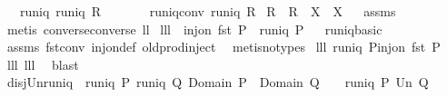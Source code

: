\begin{isabellebody}
\ \ \ runiq{\isacharcolon}\ {\isachardoublequoteopen}runiq\ R{\isachardoublequoteclose}\isanewline
\ \ \ \ \ \ \ runiq{\isacharunderscore}conv{\isacharcolon}\ {\isachardoublequoteopen}runiq\ {\isacharparenleft}R{\isacharcircum}{\isacharminus}{}{\isacharparenright}{\isachardoublequoteclose}\isanewline
{}\ {\isachardoublequoteopen}{\isacharparenleft}R{\isacharcircum}{\isacharminus}{}{\isacharparenright}\ {\isacharbackquote}{\isacharbackquote}\ R\ {\isacharbackquote}{\isacharbackquote}\ X\ {\isasymsubseteq}\ X{\isachardoublequoteclose}%
\isadelimproof
\ %
\endisadelimproof
%
\isatagproof
{}\isamarkupfalse%
\ assms\ \isamarkupfalse%
\ {\isacharparenleft}metis\ converse{\isacharunderscore}converse\ ll{}{}{\isacharparenright}%
\endisatagproof
{\isafoldproof}%
%
\isadelimproof
%
\endisadelimproof
\isanewline
\isanewline
{}\isamarkupfalse%
\ lll{}{}{\isacharcolon}\ \ {\isachardoublequoteopen}inj{\isacharunderscore}on\ fst\ P{\isachardoublequoteclose}\ \ {\isachardoublequoteopen}runiq\ P{\isachardoublequoteclose}%
\isadelimproof
\ %
\endisadelimproof
%
\isatagproof
{}\isamarkupfalse%
\ runiq{\isacharunderscore}basic\ \isanewline
{}\isamarkupfalse%
\ assms\ fst{\isacharunderscore}conv\ inj{\isacharunderscore}on{\isacharunderscore}def\ old{\isachardot}prod{\isachardot}inject\ \isamarkupfalse%
\ {\isacharparenleft}metis{\isacharparenleft}no{\isacharunderscore}types{\isacharparenright}{\isacharparenright}%
\endisatagproof
{\isafoldproof}%
%
\isadelimproof
%
\endisadelimproof
\isanewline
\isanewline
{}\isamarkupfalse%
\ lll{}{}{\isacharcolon}\ {\isachardoublequoteopen}runiq\ P{\isacharequal}inj{\isacharunderscore}on\ fst\ P{\isachardoublequoteclose}%
\isadelimproof
\ %
\endisadelimproof
%
\isatagproof
{}\isamarkupfalse%
\ lll{}{}\ lll{}{}\ \isamarkupfalse%
\ blast%
\endisatagproof
{\isafoldproof}%
%
\isadelimproof
%
\endisadelimproof
\isanewline
\isanewline
\isanewline
{}\isamarkupfalse%
\ disj{\isacharunderscore}Un{\isacharunderscore}runiq{\isacharcolon}\ \ {\isachardoublequoteopen}runiq\ P{\isachardoublequoteclose}\ {\isachardoublequoteopen}runiq\ Q{\isachardoublequoteclose}\ {\isachardoublequoteopen}Domain\ P\ {\isasyminter}\ {\isacharparenleft}Domain\ Q{\isacharparenright}\ {\isacharequal}\ {\isacharbraceleft}{\isacharbraceright}{\isachardoublequoteclose}\ \ {\isachardoublequoteopen}runiq\ {\isacharparenleft}P\ Un\ Q{\isacharparenright}{\isachardoublequoteclose}\ \isanewline

\end{isabellebody}
